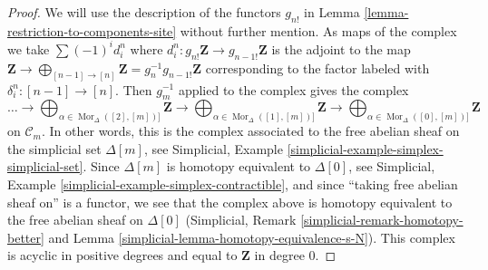 \documentclass{stacks-project}
\theoremstyle{plain}
\theoremstyle{definition}
\theoremstyle{remark}
\numberwithin{equation}{subsection}
\def\Mor{\mathop{\mathrm{Mor}}\nolimits}
\begin{document}
\begin{proof}
We will use the description of the functors $g_{n!}$ in
Lemma \ref{lemma-restriction-to-components-site} without further mention.
As maps of the complex we take $\sum (-1)^i d^n_i$ where
$d^n_i : g_{n!}\mathbf{Z} \to g_{n - 1!}\mathbf{Z}$ is the
adjoint to the map $\mathbf{Z} \to
\bigoplus_{[n - 1] \to [n]} \mathbf{Z} = g_n^{-1}g_{n - 1!}\mathbf{Z}$
corresponding to the factor labeled with $\delta^n_i : [n - 1] \to [n]$.
Then $g_m^{-1}$ applied to the complex gives the complex
$$
\ldots \to
\bigoplus\nolimits_{\alpha \in \Mor_\Delta([2], [m])]} \mathbf{Z} \to
\bigoplus\nolimits_{\alpha \in \Mor_\Delta([1], [m])]} \mathbf{Z} \to
\bigoplus\nolimits_{\alpha \in \Mor_\Delta([0], [m])]} \mathbf{Z}
$$
on $\mathcal{C}_m$.
In other words, this is the complex associated to the
free abelian sheaf on the simplicial set $\Delta[m]$, see
Simplicial, Example \ref{simplicial-example-simplex-simplicial-set}.
Since $\Delta[m]$ is homotopy equivalent to $\Delta[0]$, see
Simplicial, Example \ref{simplicial-example-simplex-contractible},
and since ``taking free abelian sheaf on'' is a functor,
we see that the complex above is homotopy equivalent to
the free abelian sheaf on $\Delta[0]$
(Simplicial, Remark \ref{simplicial-remark-homotopy-better} and
Lemma \ref{simplicial-lemma-homotopy-equivalence-s-N}).
This complex is acyclic in positive degrees
and equal to $\mathbf{Z}$ in degree $0$.
\end{proof}
\end{document}
